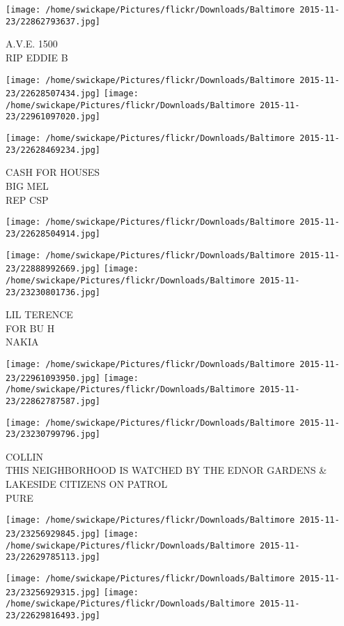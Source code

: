 \documentclass[10pt,letterpaper]{article}
\begin{document}
\vspace{0.25in}
\texttt{[image: /home/swickape/Pictures/flickr/Downloads/Baltimore 2015-11-23/22862793637.jpg]}

A.V.E. 1500\\
RIP EDDIE B
\pagebreak

\texttt{[image: /home/swickape/Pictures/flickr/Downloads/Baltimore 2015-11-23/22628507434.jpg]}
\texttt{[image: /home/swickape/Pictures/flickr/Downloads/Baltimore 2015-11-23/22961097020.jpg]}

\texttt{[image: /home/swickape/Pictures/flickr/Downloads/Baltimore 2015-11-23/22628469234.jpg]}

CASH FOR HOUSES\\
BIG MEL\\
REP CSP
\pagebreak

\texttt{[image: /home/swickape/Pictures/flickr/Downloads/Baltimore 2015-11-23/22628504914.jpg]}

\vspace{0.25in}
\texttt{[image: /home/swickape/Pictures/flickr/Downloads/Baltimore 2015-11-23/22888992669.jpg]}
\texttt{[image: /home/swickape/Pictures/flickr/Downloads/Baltimore 2015-11-23/23230801736.jpg]}

LIL TERENCE\\
FOR BU H\\
NAKIA
\pagebreak

\texttt{[image: /home/swickape/Pictures/flickr/Downloads/Baltimore 2015-11-23/22961093950.jpg]}
\texttt{[image: /home/swickape/Pictures/flickr/Downloads/Baltimore 2015-11-23/22862787587.jpg]}

\vspace{0.25in}
\texttt{[image: /home/swickape/Pictures/flickr/Downloads/Baltimore 2015-11-23/23230799796.jpg]}

COLLIN\\
THIS NEIGHBORHOOD IS WATCHED BY THE EDNOR GARDENS \& LAKESIDE CITIZENS ON PATROL\\
PURE
\pagebreak

\texttt{[image: /home/swickape/Pictures/flickr/Downloads/Baltimore 2015-11-23/23256929845.jpg]}
\texttt{[image: /home/swickape/Pictures/flickr/Downloads/Baltimore 2015-11-23/22629785113.jpg]}

\texttt{[image: /home/swickape/Pictures/flickr/Downloads/Baltimore 2015-11-23/23256929315.jpg]}
\texttt{[image: /home/swickape/Pictures/flickr/Downloads/Baltimore 2015-11-23/22629816493.jpg]}
\end{document}
